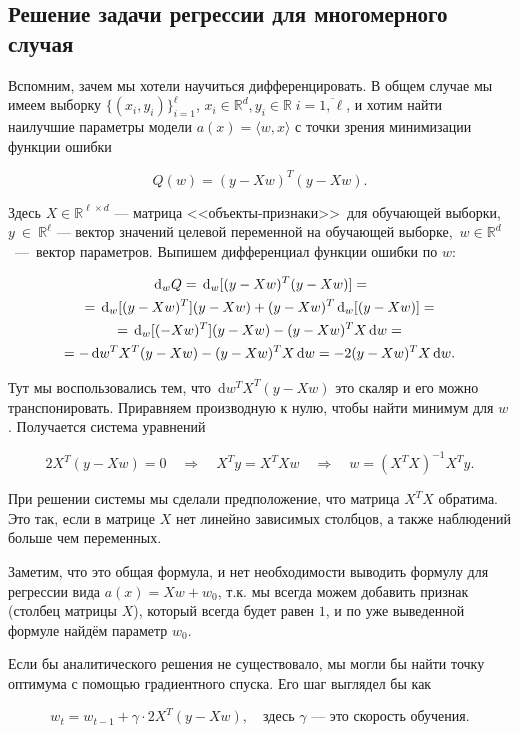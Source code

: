 \documentclass[12pt,fleqn]{article}
\newcommand{\dx}[1]{\,\mathrm{d}#1} %
\begin{document}
\subsection{Решение задачи регрессии для многомерного случая}

Вспомним, зачем мы хотели научиться дифференцировать. В общем случае мы имеем выборку $\{(x_i, y_i)\}_{i=1}^\ell$, $x_i \in \mathbb{R}^d, y_i \in \mathbb{R} \; i = \overline{1, \ell}$, и хотим найти наилучшие параметры модели $a(x) = \langle w, x \rangle$ с точки зрения минимизации функции ошибки

$$Q(w) = (y - Xw)^T(y - Xw).$$

Здесь $X\in \mathbb{R}^{\ell \times d}$ — матрица <<объекты-признаки>>\ для обучающей выборки, $y~\in~\mathbb{R}^\ell$ — вектор значений целевой переменной на обучающей выборке,~$w \in \mathbb{R}^d$~—~вектор параметров. Выпишем дифференциал функции ошибки по $w$:

\begin{multline*}
\dx_w Q = \dx_w[(y - Xw)^T(y - Xw)] = \\ = \dx_w[(y - Xw)^T] (y - Xw) + (y - Xw)^T\dx_w[(y - Xw)] = \\ = \dx_w[(-Xw)^T] (y - Xw) - (y - Xw)^TX\dx w = \\ = - \dx w^T X^T (y - Xw) - (y - Xw)^TX\dx w = -2 (y - Xw)^TX \dx w.
\end{multline*} 

Тут мы воспользовались тем, что $ \dx w^T X^T (y - Xw)$ это скаляр и его можно транспонировать. Приравняем производную к нулю, чтобы найти минимум для $w$. Получается система уравнений

\[
2X^T(y-Xw) = 0 \quad \Rightarrow  \quad  X^Ty = X^TX w \quad \Rightarrow  \quad w = (X^TX)^{-1} X^Ty.
\]

При решении системы мы сделали предположение, что матрица $X^TX$ обратима. Это так, если в матрице $X$ нет линейно зависимых столбцов, а также наблюдений больше чем переменных.

Заметим, что это общая формула, и нет необходимости выводить формулу для регрессии вида $a(x) = Xw + w_0$, т.к. мы всегда можем добавить признак (столбец матрицы $X$), который всегда будет равен $1$, и по уже выведенной формуле найдём параметр $w_0$.

Если бы аналитического решения не существовало, мы могли бы найти точку оптимума с помощью градиентного спуска. Его шаг выглядел бы как 

\[
w_t = w_{t-1} + \gamma \cdot 2X^T(y-Xw), \quad \text{здесь $\gamma$ --- это скорость обучения.}
\]
\end{document}
